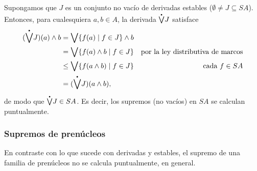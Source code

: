 Supongamos que $J$ es un conjunto no vacío de derivadas estables
($\emptyset\neq J\subseteq SA$).
Entonces, para cualesquiera $a,b\in A$, la derivada $\pSup J$ satisface
\begin{align*}
  (\pSup J)(a)\inf b
  &= \Sup\{f(a) \mid f\in J\} \inf b \\
  &= \Sup\{f(a)\inf b \mid f\in J\}
    & \text{por la ley distributiva de marcos} \\
  &\leq \Sup\{f(a\inf b) \mid f\in J \}
    & \text{cada $f\in SA$} \\
  &= (\pSup J)(a\inf b),
\end{align*}
de modo que $\pSup J\in SA$.
Es decir, los supremos (no vacíos) en $SA$ se calculan
puntualmente.

\subsubsection{Supremos de prenúcleos }

En contraste con lo que sucede con derivadas y estables, el supremo
de una familia de prenúcleos no se calcula puntualmente, en general.

